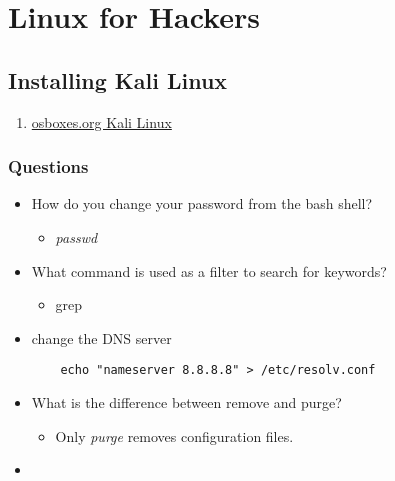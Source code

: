 \documentclass[12pt,letterpaper]{article}
\begin{document}
\section{Linux for Hackers}
\subsection{Installing Kali Linux} 
\begin{enumerate}
    \item \href{https://www.osboxes.org/kali-linux/}{osboxes.org Kali Linux}
\end{enumerate}
\subsubsection{Questions}
\begin{itemize}
    \item How do you change your password from the bash shell? 
    \begin{itemize}
        \item \textit{passwd}
    \end{itemize}
    \item What command is used as a filter to search for keywords? 
    \begin{itemize}
        \item grep
    \end{itemize}
    \item change the DNS server 
    \begin{lstlisting}
    echo "nameserver 8.8.8.8" > /etc/resolv.conf
    \end{lstlisting}
    \item What is the difference between remove and purge? 
    \begin{itemize}
        \item Only \textit{purge} removes configuration files. 
    \end{itemize}
    \item 
\end{itemize}
\end{document}
